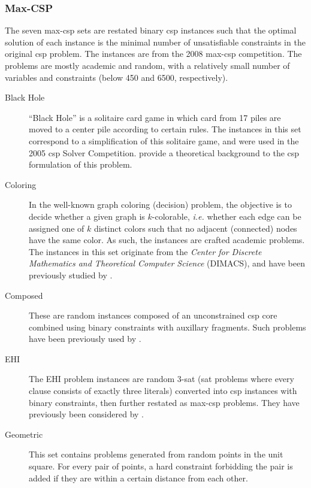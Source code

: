 
\subsubsection{Max-CSP}
The seven max-\gls{csp} sets are restated binary \gls{csp} instances such that the optimal solution of each instance is the minimal number of unsatisfiable constraints in the original \gls{csp} problem.
The instances are from the 2008 max-\gls{csp} competition.
The problems are mostly academic and random, with a relatively small number of variables and constraints (below \num{450} and \num{6500}, respectively).

\begin{description}
	\item[Black Hole]
		\enquote{Black Hole} is a solitaire card game in which card from 17 piles are moved to a center pile according to certain rules.
		The instances in this set correspond to a simplification of this solitaire game, and were used in the 2005 \gls{csp} Solver Competition.
		\Textcite{Gent07} provide a theoretical background to the \gls{csp} formulation of this problem.
	\item[Coloring]
		In the well-known graph coloring (decision) problem, the objective is to decide whether a given graph is \(k\)-colorable, \emph{i.e.} whether each edge can be assigned one of \(k\) distinct colors such that no adjacent (connected) nodes have the same color.
		As such, the instances are crafted academic problems.
		The instances in this set originate from the \emph{Center for Discrete Mathematics and Theoretical Computer Science} (DIMACS), and have been previously studied by \textcite{Benhamou07}.
	\item[Composed]
		These are random instances composed of an unconstrained \gls{csp} core combined using binary constraints with auxillary fragments.
		Such problems have been previously used by \textcite{Lecoutre04,Jussien00}.
	\item[EHI]
		The EHI problem instances are random 3-\gls{sat} (\gls{sat} problems where every clause consists of exactly three literals) converted into \gls{csp} instances with binary constraints, then further restated as max-\gls{csp} problems. They have previously been considered by \textcite{Lecoutre04}.
	\item[Geometric]
		This set contains problems generated from random points in the unit square. For every pair of points, a hard constraint forbidding the pair is added if they are within a certain distance from each other.

\end{description}
